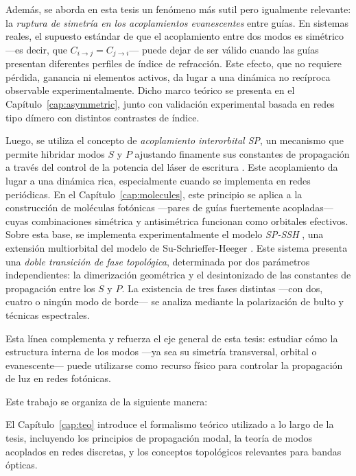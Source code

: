 Además, se aborda en esta tesis un fenómeno más sutil pero igualmente relevante: la \textit{ruptura de simetría en los acoplamientos evanescentes} entre guías. En sistemas reales, el supuesto estándar de que el acoplamiento entre dos modos es simétrico —es decir, que \( C_{i \to j} = C_{j \to i} \)— puede dejar de ser válido cuando las guías presentan diferentes perfiles de índice de refracción. Este efecto, que no requiere pérdida, ganancia ni elementos activos, da lugar a una dinámica no recíproca observable experimentalmente. Dicho marco teórico se presenta en el Capítulo~\ref{cap:asymmetric}, junto con validación experimental basada en redes tipo dímero con distintos contrastes de índice.

Luego, se utiliza el concepto de \textit{acoplamiento interorbital SP}, un mecanismo que permite hibridar modos \( S \) y \( P \) ajustando finamente sus constantes de propagación a través del control de la potencia del láser de escritura \cite{interorbital}. Este acoplamiento da lugar a una dinámica rica, especialmente cuando se implementa en redes periódicas. En el Capítulo~\ref{cap:molecules}, este principio se aplica a la construcción de moléculas fotónicas —pares de guías fuertemente acopladas— cuyas combinaciones simétrica y antisimétrica funcionan como orbitales efectivos. Sobre esta base, se implementa experimentalmente el modelo \textit{SP-SSH} \cite{SPSSH}, una extensión multiorbital del modelo de Su-Schrieffer-Heeger \citep{ssh}. Este sistema presenta una \textit{doble transición de fase topológica}, determinada por dos parámetros independientes: la dimerización geométrica y el desintonizado de las constantes de propagación entre los $S$ y $P$. La existencia de tres fases distintas —con dos, cuatro o ningún modo de borde— se analiza mediante la polarización de bulto y técnicas espectrales.

 

Esta línea complementa y refuerza el eje general de esta tesis: estudiar cómo la estructura interna de los modos —ya sea su simetría transversal, orbital o evanescente— puede utilizarse como recurso físico para controlar la propagación de luz en redes fotónicas.


\vspace{1em}

Este trabajo se organiza de la siguiente manera:

El Capítulo~\ref{cap:teo} introduce el formalismo teórico utilizado a lo largo de la tesis, incluyendo los principios de propagación modal, la teoría de modos acoplados en redes discretas, y los conceptos topológicos relevantes para bandas ópticas.

